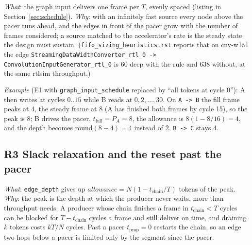 \documentclass[10pt,a4paper]{article}
\newcommand{\code}[1]{\texttt{#1}}
\newcommand{\Tg}{T}           %
\newcommand{\NF}{N}            %
\begin{document}
\emph{What}: the graph input delivers one frame per $\Tg$, evenly spaced (listing in
Section~\ref{sec:schedule}). \emph{Why}: with an infinitely fast source every
node above the pacer runs ahead, and the edges in front of the pacer grow with the
number of frames considered; a source matched to the accelerator's rate is the
steady state the design must sustain. (\code{fifo\_sizing\_heuristics.rst} reports that on cnv-w1a1 the edge
\code{StreamingDataWidthConverter\_rtl\_0 -> ConvolutionInputGenerator\_rtl\_0} is 60 deep
with the rule and 638 without, at the same rtlsim throughput.)

\emph{Example} (E1 with \code{graph\_input\_schedule} replaced by ``all tokens at
cycle 0''): A then writes at cycles $0..15$ while B reads at $0,2,\dots,30$. On
\code{A -> B} the fill frame peaks at 4, the steady frame at 8 (A has finished
both frames by cycle 15), so the peak is 8; B drives the pacer, $t_{\mathrm{full}}=P_A=8$, the
allowance is $8(1-8/16)=4$, and the depth becomes $\mathrm{round}(8-4)=4$
instead of 2. \code{B -> C} stays 4.

\subsection{R3 Slack relaxation and the reset past the pacer}\label{sec:relax}

\emph{What}: \code{edge\_depth} gives up $\mathit{allowance}=\NF(1-t_{\mathrm{chain}}/\Tg)$
tokens of the peak. \emph{Why}: the peak is the depth at which the producer never
waits, more than throughput needs. A producer whose chain finishes a frame in
$t_{\mathrm{chain}}<\Tg$ cycles can be blocked for $\Tg-t_{\mathrm{chain}}$ cycles a
frame and still deliver on time, and draining $k$ tokens costs $k\Tg/\NF$ cycles.
Past a pacer $t_{\mathrm{prop}}=0$ restarts the chain, so an edge two hops below a
pacer is limited only by the segment since the pacer.
\end{document}
